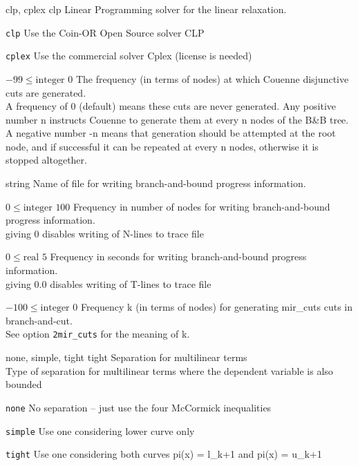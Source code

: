 %
{\ttfamily clp, cplex}%
{clp}%
{Linear Programming solver for the linear relaxation.}%
{\begin{list}{}{
\setlength{\parsep}{0em}
\setlength{\leftmargin}{5ex}
\setlength{\labelwidth}{2ex}
\setlength{\itemindent}{0ex}
\setlength{\topsep}{0pt}}
\item[\texttt{clp}] Use the Coin-OR Open Source solver CLP
\item[\texttt{cplex}] Use the commercial solver Cplex (license is needed)
\end{list}
}

%
{$-99\leq\textrm{integer}$}%
{$0$}%
{The frequency (in terms of nodes) at which Couenne disjunctive cuts are generated.\\
A frequency of 0 (default) means these cuts are never generated. Any positive number n instructs Couenne to generate them at every n nodes of the B\&B tree. A negative number -n means that generation should be attempted at the root node, and if successful it can be repeated at every n nodes, otherwise it is stopped altogether.}%
{}

%
{string}%
{}%
{Name of file for writing branch-and-bound progress information.}%
{}

%
{$0\leq\textrm{integer}$}%
{$100$}%
{Frequency in number of nodes for writing branch-and-bound progress information.\\
giving 0 disables writing of N-lines to trace file}%
{}

%
{$0\leq\textrm{real}$}%
{$5$}%
{Frequency in seconds for writing branch-and-bound progress information.\\
giving 0.0 disables writing of T-lines to trace file}%
{}

%
{$-100\leq\textrm{integer}$}%
{$0$}%
{Frequency k (in terms of nodes) for generating mir\_cuts cuts in branch-and-cut.\\
See option \texttt{2mir\_cuts} for the meaning of k.}%
{}

%
{\ttfamily none, simple, tight}%
{tight}%
{Separation for multilinear terms\\
Type of separation for multilinear terms where the dependent variable is also bounded}%
{\begin{list}{}{
\setlength{\parsep}{0em}
\setlength{\leftmargin}{5ex}
\setlength{\labelwidth}{2ex}
\setlength{\itemindent}{0ex}
\setlength{\topsep}{0pt}}
\item[\texttt{none}] No separation -- just use the four McCormick inequalities
\item[\texttt{simple}] Use one considering lower curve only
\item[\texttt{tight}] Use one considering both curves pi(x) = l\_{k+1} and pi(x) = u\_{k+1}
\end{list}
}

